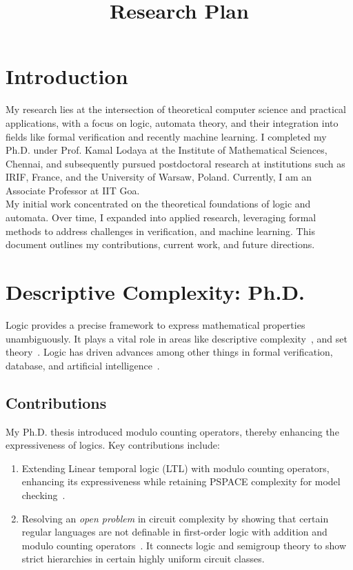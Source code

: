 \documentclass[11pt,a4paper,sans]{moderncv} %
\title{Research Plan}
\begin{document}
\makecvtitle %

\section{Introduction}
My research lies at the intersection of theoretical computer science and practical applications, with a focus on logic, automata theory, and their integration into fields like formal verification and recently machine learning. I completed my Ph.D. under Prof. Kamal Lodaya at the Institute of Mathematical Sciences, Chennai, and subsequently pursued postdoctoral research at institutions such as IRIF, France, and the University of Warsaw, Poland. Currently, I am an Associate Professor at IIT Goa. \\

My initial work concentrated on the theoretical foundations of logic and automata. Over time, I expanded into applied research, leveraging formal methods to address challenges in verification, and machine learning. This document outlines my contributions, current work, and future directions.

\section{Descriptive Complexity: Ph.D.}
Logic provides a precise framework to express mathematical properties unambiguously. It plays a vital role in areas like descriptive complexity~\cite{immerman_book}, and set theory~\cite{ject_setTheory}.
Logic has driven advances among other things in formal verification, database, and artificial intelligence~\cite{vardi_logicEffectiveness}.

\subsection{Contributions}
My Ph.D. thesis \cite{sav_thesis} introduced modulo counting operators, thereby enhancing the expressiveness of logics. Key contributions include:
\begin{enumerate}
 \item Extending Linear temporal logic (\textsf{LTL}) with modulo counting operators, enhancing its expressiveness while retaining PSPACE complexity for model checking~\cite{my_ltlmod,my_ltlsuccinct}.
 \item Resolving an \emph{open problem} in circuit complexity by showing that certain regular languages are not definable in first-order logic with addition and modulo counting operators~\cite{my_foplus}. It connects logic and semigroup theory to show strict hierarchies in certain highly uniform circuit classes.
\end{enumerate}
\end{document}
